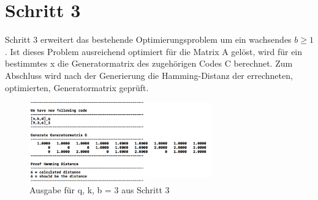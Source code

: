 \section{Schritt 3}
Schritt 3 erweitert das bestehende Optimierungsproblem  um ein wachsendes $b\geq 1$. Ist dieses Problem ausreichend optimiert für die Matrix A gelöst, wird für ein bestimmtes x die Generatormatrix des zugehörigen Codes C berechnet.  Zum Abschluss wird nach der Generierung die Hamming-Distanz der errechneten, optimierten, Generatormatrix geprüft. 
\begin{figure}[h!]
	\centering
	\includegraphics[width=0.7\textwidth]{Pictures/step3_3_3_3}
	\caption{Ausgabe für q, k, b = 3 aus Schritt 3}
\end{figure}
\newpage